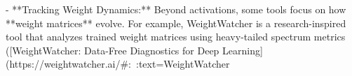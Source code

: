 - **Tracking Weight Dynamics:** Beyond activations, some tools focus on how **weight matrices** evolve. For example, WeightWatcher is a research-inspired tool that analyzes trained weight matrices using heavy-tailed spectrum metrics ([WeightWatcher: Data-Free Diagnostics for Deep Learning](https://weightwatcher.ai/#:~:text=WeightWatcher%

